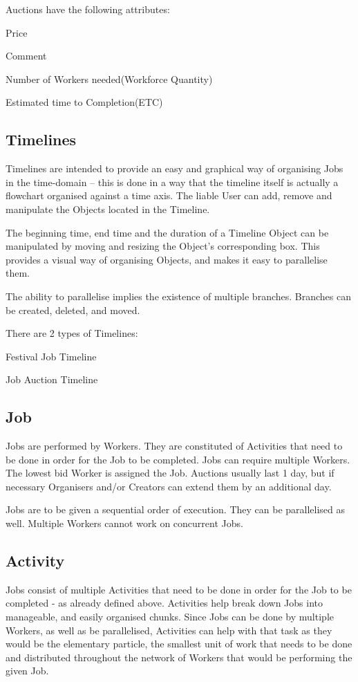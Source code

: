 		 Auctions have the following attributes:
		\begin{packed_enum}
			\item Price
			\item Comment
			\item Number of Workers needed(Workforce Quantity)
			\item Estimated time to Completion(ETC)
		\end{packed_enum}
	
		\subsection{Timelines}
		 Timelines are intended to provide an easy and graphical way of organising Jobs in the time-domain – this is done in a way that the timeline itself is actually a flowchart organised against a time axis. The liable User can add, remove and manipulate the Objects located in the Timeline.
		
		 The beginning time, end time and the duration of a Timeline Object can be manipulated by moving and resizing the Object’s corresponding box. This provides a visual way of organising Objects, and makes it easy to parallelise them.
		
		 The ability to parallelise implies the existence of multiple branches. Branches can be created, deleted, and moved.
		
		\bigbreak
		 There are 2 types of Timelines:
		\begin{packed_item}
			\item Festival Job Timeline
			\item Job Auction Timeline	
		\end{packed_item}
	
		\subsection{Job}
		 Jobs are performed by Workers. They are constituted of Activities that need to be done in order for the Job to be completed. Jobs can require multiple Workers. The lowest bid Worker is assigned the Job. Auctions usually last 1 day, but if necessary Organisers and/or Creators can extend them by an additional day.
		
		 Jobs are to be given a sequential order of execution. They can be parallelised as well. Multiple Workers cannot work on concurrent Jobs.
		
		\subsection{Activity}
		 Jobs consist of multiple Activities that need to be done in order for the Job to be completed - as already defined above. Activities help break down Jobs into manageable, and easily organised chunks. Since Jobs can be done by multiple Workers, as well as be parallelised, Activities can help with that task as they would be the elementary particle, the smallest unit of work that needs to be done and distributed throughout the network of Workers that would be performing the given Job.
		
